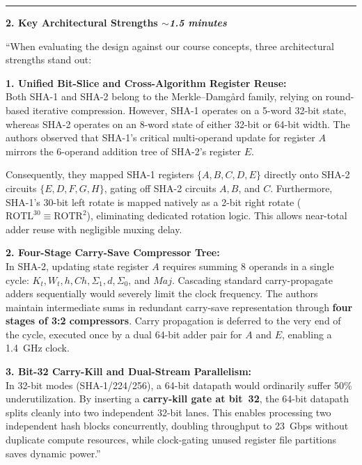 \documentclass[11pt,a4paper]{article}
\begin{document}
\vspace{0.7em}
\hrule
\vspace{0.5em}

{\large\bfseries\color{iiscblue} 2. Key Architectural Strengths \hfill \normalfont\small\itshape $\sim$1.5 minutes}

\vspace{0.2em}
``When evaluating the design against our course concepts, three architectural strengths stand out:

\textbf{1. Unified Bit-Slice and Cross-Algorithm Register Reuse:} \\
Both SHA-1 and SHA-2 belong to the Merkle--Damg{\aa}rd family, relying on round-based iterative compression. However, SHA-1 operates on a 5-word 32-bit state, whereas SHA-2 operates on an 8-word state of either 32-bit or 64-bit width. The authors observed that SHA-1's critical multi-operand update for register $A$ mirrors the 6-operand addition tree of SHA-2's register $E$. 

Consequently, they mapped SHA-1 registers $\{A, B, C, D, E\}$ directly onto SHA-2 circuits $\{E, D, F, G, H\}$, gating off SHA-2 circuits $A, B$, and $C$. Furthermore, SHA-1's 30-bit left rotate is mapped natively as a 2-bit right rotate ($\text{ROTL}^{30} \equiv \text{ROTR}^2$), eliminating dedicated rotation logic. This allows near-total adder reuse with negligible muxing delay.

\textbf{2. Four-Stage Carry-Save Compressor Tree:} \\
In SHA-2, updating state register $A$ requires summing 8 operands in a single cycle: $K_t, W_t, h, Ch, \Sigma_1, d, \Sigma_0$, and $Maj$. Cascading standard carry-propagate adders sequentially would severely limit the clock frequency. The authors maintain intermediate sums in redundant carry-save representation through \textbf{four stages of 3:2 compressors}. Carry propagation is deferred to the very end of the cycle, executed once by a dual 64-bit adder pair for $A$ and $E$, enabling a 1.4~GHz clock.

\textbf{3. Bit-32 Carry-Kill and Dual-Stream Parallelism:} \\
In 32-bit modes (SHA-1/224/256), a 64-bit datapath would ordinarily suffer 50\% underutilization. By inserting a \textbf{carry-kill gate at bit~32}, the 64-bit datapath splits cleanly into two independent 32-bit lanes. This enables processing two independent hash blocks concurrently, doubling throughput to 23~Gbps without duplicate compute resources, while clock-gating unused register file partitions saves dynamic power.''
\end{document}
